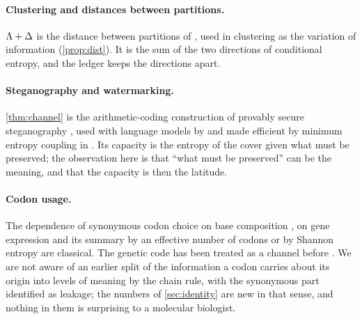 \paragraph{Clustering and distances between partitions.} $\Lambda+\Delta$ is the distance between partitions of \citet{rokhlin1967}, used in clustering as the variation of information \citep{meila2007} (\cref{prop:dist}). It is the sum of the two directions of conditional entropy, and the ledger keeps the directions apart.

\paragraph{Steganography and watermarking.} \cref{thm:channel} is the arithmetic-coding construction of provably secure steganography \citep{cachin1998,hopper2002}, used with language models by \citet{ziegler2019} and made efficient by minimum entropy coupling in \citet{dewitt2023}. Its capacity is the entropy of the cover given what must be preserved; the observation here is that ``what must be preserved'' can be the meaning, and that the capacity is then the latitude.

\paragraph{Codon usage.} The dependence of synonymous codon choice on base composition \citep{sueoka1962,muto1987}, on gene expression \citep{gouy1982,sharp1987} and its summary by an effective number of codons \citep{wright1990} or by Shannon entropy \citep{zeeberg2002} are classical. The genetic code has been treated as a channel before \citep{yockey1992}. We are not aware of an earlier split of the information a codon carries about its origin into levels of meaning by the chain rule, with the synonymous part identified as leakage; the numbers of \cref{sec:identity} are new in that sense, and nothing in them is surprising to a molecular biologist.
